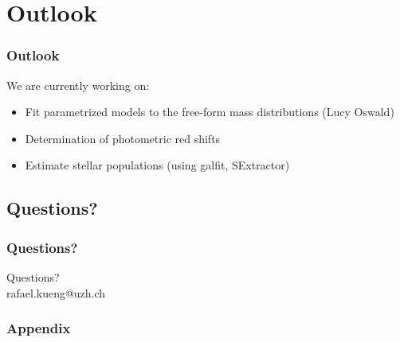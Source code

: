 \documentclass{beamer}
\begin{document}
%






\section{Outlook}

\begin{frame}
  \frametitle{Outlook}
  We are currently working on:
  \begin{itemize}
  	\item Fit parametrized models to the free-form mass distributions (Lucy Oswald)
    \item Determination of photometric red shifts
    \item Estimate stellar populations (using galfit, SExtractor)
  \end{itemize}
\end{frame}



\subsection*{Questions?}

\begin{frame}
  \frametitle{Questions?}
  Questions? \\
  rafael.kueng@uzh.ch
\end{frame}




\appendix

\begin{frame}
  \frametitle{Appendix}
\end{frame}
\end{document}
